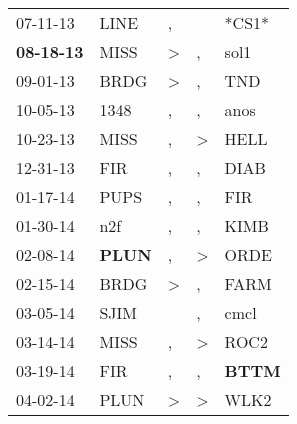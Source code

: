 \begin{supertabular}{p{0.07\textwidth}p{0.06\textwidth}p{0.02\textwidth}p{0.02\textwidth}p{0.06\textwidth}}
          07-11-13\textsuperscript{} &           LINE\textsuperscript{} &                , &                  &                            *CS1* \\
 \textbf{08-18-13\textsuperscript{}} &           MISS\textsuperscript{} &     \textgreater &                , &           sol1\textsuperscript{} \\
          09-01-13\textsuperscript{} &           BRDG\textsuperscript{} &     \textgreater &                , &            TND\textsuperscript{} \\
          10-05-13\textsuperscript{} &           1348\textsuperscript{} &                , &                , &           anos\textsuperscript{} \\
          10-23-13\textsuperscript{} &           MISS\textsuperscript{} &                , &     \textgreater &           HELL\textsuperscript{} \\
          12-31-13\textsuperscript{} &            FIR\textsuperscript{} &                , &                , &           DIAB\textsuperscript{} \\
          01-17-14\textsuperscript{} &           PUPS\textsuperscript{} &                , &                , &            FIR\textsuperscript{} \\
          01-30-14\textsuperscript{} &            n2f\textsuperscript{} &                , &                , &           KIMB\textsuperscript{} \\
          02-08-14\textsuperscript{} &  \textbf{PLUN\textsuperscript{}} &                , &     \textgreater &           ORDE\textsuperscript{} \\
          02-15-14\textsuperscript{} &           BRDG\textsuperscript{} &     \textgreater &                , &           FARM\textsuperscript{} \\
          03-05-14\textsuperscript{} &           SJIM\textsuperscript{} &                  &                , &           cmcl\textsuperscript{} \\
          03-14-14\textsuperscript{} &           MISS\textsuperscript{} &                , &     \textgreater &           ROC2\textsuperscript{} \\
          03-19-14\textsuperscript{} &            FIR\textsuperscript{} &                , &                , &  \textbf{BTTM\textsuperscript{}} \\
          04-02-14\textsuperscript{} &           PLUN\textsuperscript{} &     \textgreater &     \textgreater &           WLK2\textsuperscript{} \\

\end{supertabular}

